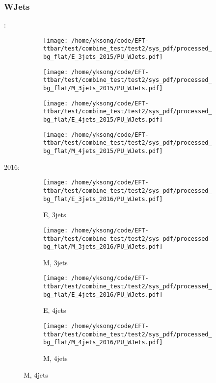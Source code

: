 \documentclass{beamer}
\begin{document}
\begin{frame}
\frametitle{WJets}
\fontsize{5}{1}:
\begin{figure}
\centering
\begin{subfigure}[b]{0.24\textwidth}
\texttt{[image: /home/yksong/code/EFT-ttbar/test/combine\_test/test2/sys\_pdf/processed\_bg\_flat/E\_3jets\_2015/PU\_WJets.pdf]}
\end{subfigure}
\begin{subfigure}[b]{0.24\textwidth}
\texttt{[image: /home/yksong/code/EFT-ttbar/test/combine\_test/test2/sys\_pdf/processed\_bg\_flat/M\_3jets\_2015/PU\_WJets.pdf]}
\end{subfigure}
\begin{subfigure}[b]{0.24\textwidth}
\texttt{[image: /home/yksong/code/EFT-ttbar/test/combine\_test/test2/sys\_pdf/processed\_bg\_flat/E\_4jets\_2015/PU\_WJets.pdf]}
\end{subfigure}
\begin{subfigure}[b]{0.24\textwidth}
\texttt{[image: /home/yksong/code/EFT-ttbar/test/combine\_test/test2/sys\_pdf/processed\_bg\_flat/M\_4jets\_2015/PU\_WJets.pdf]}
\end{subfigure}
\end{figure}
2016:
\begin{figure}
\centering
\begin{subfigure}[b]{0.24\textwidth}
\texttt{[image: /home/yksong/code/EFT-ttbar/test/combine\_test/test2/sys\_pdf/processed\_bg\_flat/E\_3jets\_2016/PU\_WJets.pdf]}
\captionsetup{font=tiny}
\caption{E, 3jets}
\end{subfigure}
\begin{subfigure}[b]{0.24\textwidth}
\texttt{[image: /home/yksong/code/EFT-ttbar/test/combine\_test/test2/sys\_pdf/processed\_bg\_flat/M\_3jets\_2016/PU\_WJets.pdf]}
\captionsetup{font=tiny}
\caption{M, 3jets}
\end{subfigure}
\begin{subfigure}[b]{0.24\textwidth}
\texttt{[image: /home/yksong/code/EFT-ttbar/test/combine\_test/test2/sys\_pdf/processed\_bg\_flat/E\_4jets\_2016/PU\_WJets.pdf]}
\captionsetup{font=tiny}
\caption{E, 4jets}
\end{subfigure}
\begin{subfigure}[b]{0.24\textwidth}
\texttt{[image: /home/yksong/code/EFT-ttbar/test/combine\_test/test2/sys\_pdf/processed\_bg\_flat/M\_4jets\_2016/PU\_WJets.pdf]}
\captionsetup{font=tiny}
\caption{M, 4jets}
\end{subfigure}
\end{figure}
\end{frame}
\end{document}
